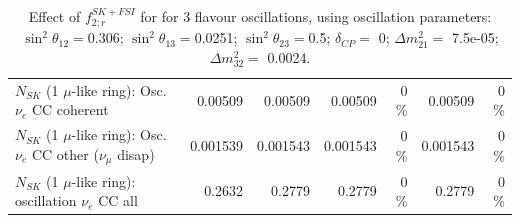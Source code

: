 \begin{table}
\begin{tabular}{| l | r | r | r  r | r  r |}
                          $N_{SK}$ (1 $\mu$-like ring): Osc. $\nu_e$ CC coherent &         0.00509 &         0.00509 &         0.00509 &        0 \%  &         0.00509 &        0 \%  \\ 
           $N_{SK}$ (1 $\mu$-like ring): Osc. $\nu_e$ CC other ($\nu_\mu$ disap) &        0.001539 &        0.001543 &        0.001543 &        0 \%  &        0.001543 &        0 \%  \\ 
                        $N_{SK}$ (1 $\mu$-like ring): oscillation $\nu_e$ CC all &          0.2632 &          0.2779 &          0.2779 &        0 \%  &          0.2779 &        0 \%  \\ 
\hline
\hline
\end{tabular}
\caption{ Effect of $f_{2; r}^{SK+FSI}$ for for 3 flavour oscillations, using oscillation parameters:  $\sin^2\theta_{12} = $0.306; $\sin^2\theta_{13} = $0.0251; $\sin^2\theta_{23} = $0.5; $\delta_{CP} = $        0; $\Delta m^2_{21} = $    7.5e-05; $\Delta m^2_{32} = $    0.0024. }
\label{tab:num_skdetfsi_002_1RmuT_3f_osc_t13:0.0251_spectralreco_spectraltrue}
\end{table}
\clearpage
